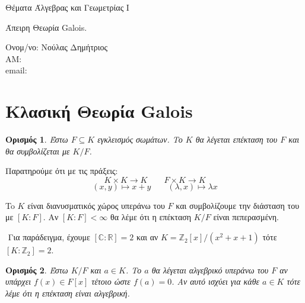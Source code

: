 \documentclass[oneside,a4paper]{article}
\newtheorem*{defn}{Ορισμός}
\newcommand {\tl}{\textlatin}
\newcommand{\Z}{\mathbb{Z}}
\begin{document}
	
	
	\begin{framed}	
		\begin{center}
			\huge Θέματα Άλγεβρας και Γεωμετρίας \tl{I}
		\end{center}
		\begin{center}
			\huge Άπειρη Θεωρία \tl{Galois}.
		\end{center}
		\vspace{0.3truecm}
		\begin{center}
			Ονομ/νο: Νούλας Δημήτριος\\
			ΑΜ: \\
			\tl{email}:
		\end{center}
		\vspace{0.3truecm}
	\end{framed}
\vspace{1cm}

\pagebreak
\section{Κλασική Θεωρία \tl{Galois}}
\vspace{1cm}

\begin{defn}
	Έστω $F\subseteq K$ εγκλεισμός σωμάτων. Το $K$ θα λέγεται επέκταση του $F$ και θα συμβολίζεται με $K/F$.
\end{defn}

Παρατηρούμε ότι με τις πράξεις:
$$K\times K \longrightarrow K \quad\quad F \times K \longrightarrow K$$
$$(x,y) \longmapsto x+y \quad\quad (\lambda, x) \longmapsto \lambda x$$

To $K$ είναι διανυσματικός χώρος υπεράνω του $F$ και συμβολίζουμε την διάσταση του με $[K:F]$. Αν $[K:F]<\infty$ θα λέμε ότι η επέκταση $K/F$ είναι πεπερασμένη.

$ $\newline
Για παράδειγμα, έχουμε $[\mathbb C : \mathbb R] = 2$ και αν $K = \Z_2 [x]/(x^2 + x + 1)$ τότε $[K:\Z_2] = 2$.

\begin{defn}
	Έστω $K/F$ και $a \in K$. Το $a$ θα λέγεται αλγεβρικό υπεράνω του $F$ αν υπάρχει $f(x) \in F[x]$ τέτοιο ώστε $f(a)=0$. Αν αυτό ισχύει για κάθε $a \in K$ τότε λέμε ότι η επέκταση είναι αλγεβρική.
\end{defn}
\end{document}
